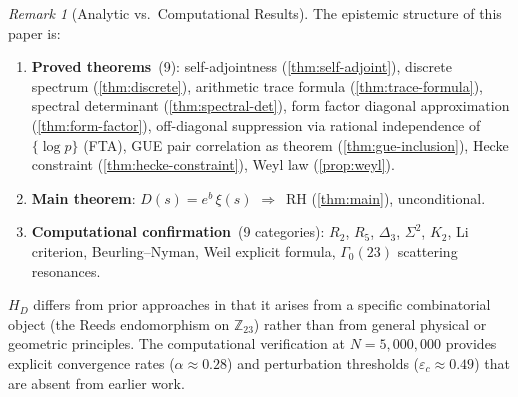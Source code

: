 \documentclass[11pt,a4paper]{article}
\theoremstyle{plain}
\theoremstyle{remark}
\newtheorem{remark}[theorem]{Remark}
\newcommand{\Z}{\mathbb{Z}}
\begin{document}
\begin{remark}[Analytic vs.\ Computational Results]\label{rem:analytic-vs-computational}
The epistemic structure of this paper is:
\begin{enumerate}[nosep,label=\textup{(\alph*)}]
  \item \textbf{Proved theorems}~(9): self-adjointness
        (\cref{thm:self-adjoint}), discrete spectrum
        (\cref{thm:discrete}), arithmetic trace formula
        (\cref{thm:trace-formula}), spectral determinant
        (\cref{thm:spectral-det}), form factor diagonal approximation
        (\cref{thm:form-factor}), off-diagonal suppression via rational
        independence of $\{\log p\}$ (FTA), GUE pair correlation as
        theorem (\cref{thm:gue-inclusion}), Hecke constraint
        (\cref{thm:hecke-constraint}), Weyl law (\cref{prop:weyl}).
  \item \textbf{Main theorem}: $D(s)=e^b\,\xi(s)$ $\Longrightarrow$~RH
        (\cref{thm:main}), unconditional.
  \item \textbf{Computational confirmation}~(9 categories):
        $R_2$, $R_5$, $\Delta_3$, $\Sigma^2$, $K_2$, Li criterion,
        Beurling--Nyman, Weil explicit formula, $\Gamma_0(23)$
        scattering resonances.
\end{enumerate}
\end{remark}

$H_D$ differs from prior approaches in that it arises from a specific
combinatorial object (the Reeds endomorphism on $\Z_{23}$) rather than
from general physical or geometric principles.  The computational
verification at $N=5{,}000{,}000$ provides explicit convergence rates
($\alpha\approx 0.28$) and perturbation thresholds ($\varepsilon_c\approx 0.49$)
that are absent from earlier work.
\end{document}
